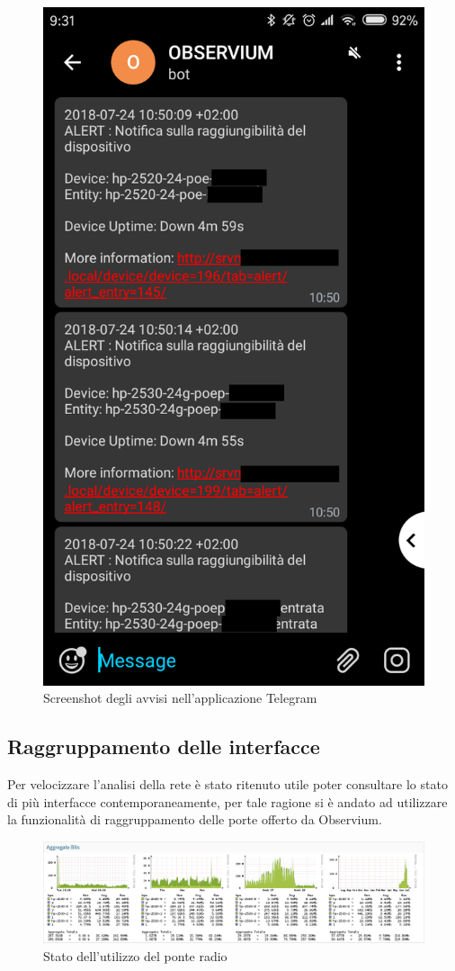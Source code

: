 \documentclass[Realizzazione.tex]{subfiles}
\begin{document}
\begin{figure}[H]
	\centering
	\includegraphics[width=0.5\linewidth]{"images/alerttelegram"}
	\caption{Screenshot degli avvisi nell'applicazione Telegram}
	\label{fig:Screenshot degli avvisi nell'applicazione Telegram}
\end{figure}

\newpage
\subsection{Raggruppamento delle interfacce}
Per velocizzare l'analisi della rete è stato ritenuto utile poter consultare lo stato di più interfacce contemporaneamente, per tale ragione si è andato ad utilizzare la funzionalità di raggruppamento delle porte offerto da Observium.

\begin{figure}[H]
	\centering
	\includegraphics[width=1\linewidth]{"images/trafficoponteradio"}
	\caption{Stato dell'utilizzo del ponte radio}
	\label{fig:Stato dell'utilizzo del ponte radio}
\end{figure}
\end{document}

